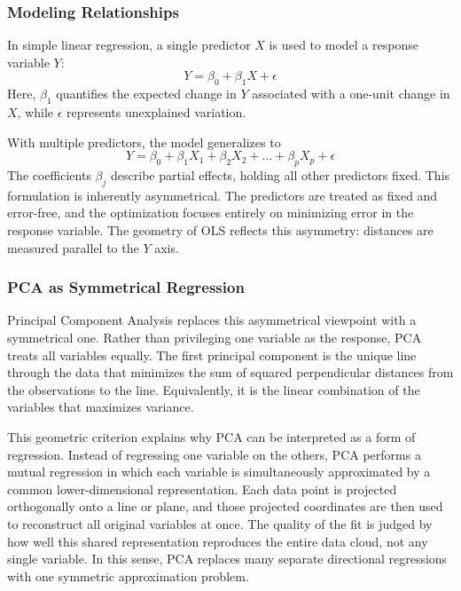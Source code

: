\medskip

\subsubsection{Modeling Relationships}

In simple linear regression, a single predictor $X$ is used to model a response variable $Y$:
\[
Y = \beta_0 + \beta_1 X + \epsilon
\]
Here, $\beta_1$ quantifies the expected change in $Y$ associated with a one-unit change in $X$, while $\epsilon$ represents unexplained variation.

With multiple predictors, the model generalizes to
\[
Y = \beta_0 + \beta_1 X_1 + \beta_2 X_2 + \dots + \beta_p X_p + \epsilon
\]
The coefficients $\beta_j$ describe partial effects, holding all other predictors fixed. This formulation is inherently asymmetrical. The predictors are treated as fixed and error-free, and the optimization focuses entirely on minimizing error in the response variable. The geometry of OLS reflects this asymmetry: distances are measured parallel to the $Y$ axis.

\medskip

\subsubsection{PCA as Symmetrical Regression}

Principal Component Analysis replaces this asymmetrical viewpoint with a symmetrical one. Rather than privileging one variable as the response, PCA treats all variables equally. The first principal component is the unique line through the data that minimizes the sum of squared perpendicular distances from the observations to the line. Equivalently, it is the linear combination of the variables that maximizes variance.

This geometric criterion explains why PCA can be interpreted as a form of regression. Instead of regressing one variable on the others, PCA performs a mutual regression in which each variable is simultaneously approximated by a common lower-dimensional representation. Each data point is projected orthogonally onto a line or plane, and those projected coordinates are then used to reconstruct all original variables at once. The quality of the fit is judged by how well this shared representation reproduces the entire data cloud, not any single variable. In this sense, PCA replaces many separate directional regressions with one symmetric approximation problem.


